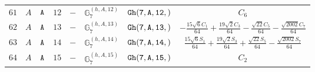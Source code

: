 \documentclass[fleqn,8pt]{jsarticle}
\begin{document}
\begin{table}[ht!]
\begin{center}
\begin{tabular}{cccccccc}
$ 61 $ & $ A $ & $ {\tt A} $ & $ 12 $ & $ - $ & $ \mathbb{G}_{7}^{(h,A,12)} $ & $ {\tt Gh(7,A,12,)} $ & $ C_{6} $ \\
$ 62 $ & $ A $ & $ {\tt A} $ & $ 13 $ & $ - $ & $ \mathbb{G}_{7}^{(h,A,13)} $ & $ {\tt Gh(7,A,13,)} $ & $ - \frac{15 \sqrt{6} C_{1}}{64} + \frac{19 \sqrt{2} C_{3}}{64} - \frac{\sqrt{22} C_{5}}{64} - \frac{\sqrt{2002} C_{7}}{64} $ \\
$ 63 $ & $ A $ & $ {\tt A} $ & $ 14 $ & $ - $ & $ \mathbb{G}_{7}^{(h,A,14)} $ & $ {\tt Gh(7,A,14,)} $ & $ \frac{15 \sqrt{6} S_{1}}{64} + \frac{19 \sqrt{2} S_{3}}{64} + \frac{\sqrt{22} S_{5}}{64} - \frac{\sqrt{2002} S_{7}}{64} $ \\
$ 64 $ & $ A $ & $ {\tt A} $ & $ 15 $ & $ - $ & $ \mathbb{G}_{7}^{(h,A,15)} $ & $ {\tt Gh(7,A,15,)} $ & $ C_{2} $ \\
 \hline \hline
\end{tabular}
\end{center}
\end{table}
\end{document}
